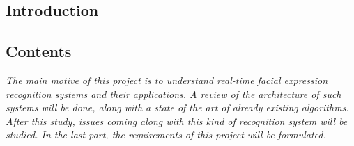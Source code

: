   \begin{titlepage}
    \vspace*{\fill}
      \part{Introduction}
    \vspace*{\fill}
  \end{titlepage}

\chapter*{Contents}

\textit{The main motive of this project is to understand real-time facial expression recognition systems and their applications. A review of the architecture of such systems will be done, along with a state of the art of already existing algorithms. After this study, issues coming along with this kind of recognition system will be studied. In the last part, the requirements of this project will be formulated.}
\pagebreak


\newpage




